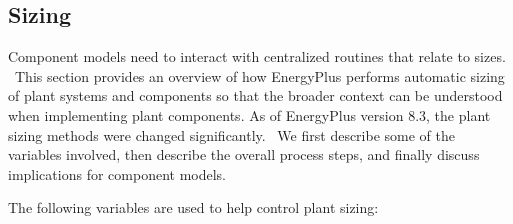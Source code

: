 \subsection{Sizing}\label{sizing}

Component models need to interact with centralized routines that relate to sizes. ~This section provides an overview of how EnergyPlus performs automatic sizing of plant systems and components so that the broader context can be understood when implementing plant components. As of EnergyPlus version 8.3, the plant sizing methods were changed significantly.~ We first describe some of the variables involved, then describe the overall process steps, and finally discuss implications for component models.

The following variables are used to help control plant sizing:

